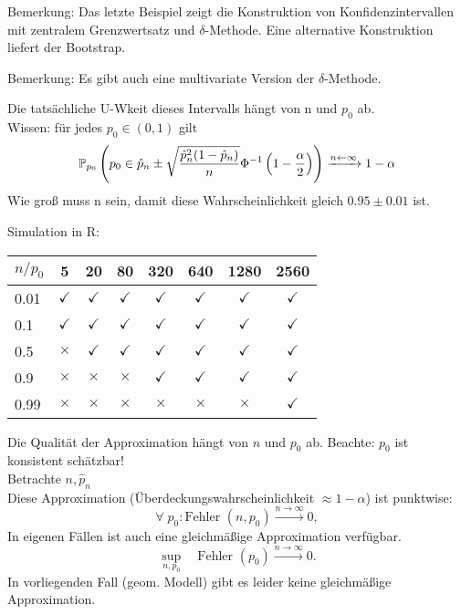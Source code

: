 \documentclass{tstextbook}
\begin{document}
\begin{remark}
	Bemerkung:
	Das letzte Beispiel zeigt die Konstruktion von Konfidenzintervallen mit zentralem Grenzwertsatz und $ \delta $-Methode. Eine alternative Konstruktion liefert der Bootstrap.
\end{remark}

\begin{remark}
	Bemerkung:
	Es gibt auch eine multivariate Version der $ \delta $-Methode.
\end{remark}

Die tatsächliche U-Wkeit dieses Intervalls hängt von n und $p_0$ ab.\\ Wissen: für jedes $p_0 \in (0,1) $ gilt 
\[ 
\mathbb P_{p_0} \left( p_0 \in \hat{p}_n \pm \sqrt{\frac{\hat{p}_n^2(1-\hat{p}_n)}{n}} \Phi^{-1} \left( 1-\frac{\alpha}{2} \right) \right) 
\xrightarrow{n \leftarrow \infty} 1 - \alpha 
 \]
Wie groß muss n sein, damit diese Wahrscheinlichkeit gleich $0.95 \pm 0.01$ ist.



Simulation in R: \\

\begin{center}
\begin{tabular}{l|ccccccc}
	$ n/p_0 $	& 5	& 20	& 80 	& 320	& 640 	& 1280 	& 2560 \\
	\midrule
	0.01		& $\checkmark$	& $\checkmark$	& $\checkmark$	& $\checkmark$	& $\checkmark$	& $\checkmark$	& $\checkmark$ \\
	0.1			& $\checkmark$	& $\checkmark$	& $\checkmark$	& $\checkmark$	& $\checkmark$	& $\checkmark$	& $\checkmark$ \\
	0.5			& $\times$	& $\checkmark$	& $\checkmark$	& $\checkmark$	& $\checkmark$	& $\checkmark$	& $\checkmark$ \\
	0.9			& $\times$	& $\times$	& $\times$	& $\checkmark$	& $\checkmark$	& $\checkmark$	& $\checkmark$ \\
	0.99		& $\times$	& $\times$	& $\times$	& $\times$	& $\times$	& $\times$	& $\checkmark$
\end{tabular}
\end{center}
\vspace{0.5cm}



Die Qualität der Approximation hängt von $n$ und $ p_0 $ ab. Beachte: $ p_0 $ ist konsistent schätzbar! \\
Betrachte $n, \hat{p}_n$\\

Diese Approximation (Überdeckungswahrscheinlichkeit $ \approx 1- \alpha $) ist punktwise: 
\[
\forall\; p_0 \colon \text{Fehler }(n, p_0) \xrightarrow{n\to\infty} 0,
\]
In eigenen Fällen ist auch eine gleichmäßige Approximation verfügbar.
\[
\underset{n, p_0}{\sup} \quad \text{Fehler }(p_0) \xrightarrow{n\to\infty} 0.
\]
In vorliegenden Fall (geom. Modell) gibt es leider keine gleichmäßige Approximation.
\end{document}
